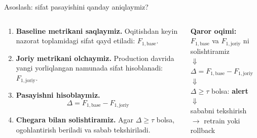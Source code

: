 \documentclass[aspectratio=169,11pt]{beamer}
\newcommand{\uzq}{\textquotesingle{}}   %
\begin{document}
\begin{frame}{Asoslash: sifat pasayishini qanday aniqlaymiz?}
  \small
\vspace{-2mm}
  \begin{columns}[T,totalwidth=\textwidth]
    \begin{column}{0.58\textwidth}
      \begin{enumerate}\setlength\itemsep{5pt}
        \item \textbf{Baseline metrikani saqlaymiz.}
        O\uzq{}qitishdan keyin nazorat to\uzq{}plamidagi sifat qayd etiladi:
        $F_{1,\text{base}}$.

        \item \textbf{Joriy metrikani o\uzq{}lchaymiz.}
        Production davrida yangi yorliqlangan namunada sifat hisoblanadi:
        $F_{1,\text{joriy}}$.

        \item \textbf{Pasayishni hisoblaymiz.}
        \[
          \Delta = F_{1,\text{base}} - F_{1,\text{joriy}}
        \]

        \item \textbf{Chegara bilan solishtiramiz.}
        Agar $\Delta \ge \tau$ bo\uzq{}lsa, ogohlantirish beriladi va sabab
        tekshiriladi.
      \end{enumerate}
    \end{column}

    \begin{column}{0.39\textwidth}
      \begin{tcolorbox}[defbox,top=2pt,bottom=2pt,left=4pt,right=4pt]
        \footnotesize
        \textbf{Qaror oqimi:}\\[3pt]
        \centering
        $F_{1,\text{base}}$ va $F_{1,\text{joriy}}$ ni solishtiramiz\\[3pt]
        $\Downarrow$\\[-1pt]
        $\Delta = F_{1,\text{base}} - F_{1,\text{joriy}}$\\[3pt]
        $\Downarrow$\\[-1pt]
        $\Delta \ge \tau$ bo\uzq{}lsa: \textbf{alert}\\[3pt]
        $\Downarrow$\\[-1pt]
        sababni tekshirish $\rightarrow$ retrain yoki rollback
      \end{tcolorbox}


\end{column}
\end{columns}
\end{frame}
\end{document}
